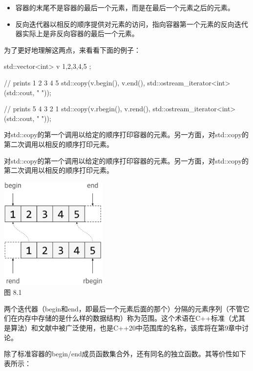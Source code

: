 \begin{itemize}
  \item
        容器的末尾不是容器的最后一个元素，而是在最后一个元素之后的元素。

  \item
        反向迭代器以相反的顺序提供对元素的访问，指向容器第一个元素的反向迭代器实际上是非反向容器的最后一个元素。
\end{itemize}

为了更好地理解这两点，来看看下面的例子：

\begin{cpp}
std::vector<int> v{ 1,2,3,4,5 };

// prints 1 2 3 4 5
std::copy(v.begin(), v.end(),
		  std::ostream_iterator<int>(std::cout, " "));

// prints 5 4 3 2 1
std::copy(v.rbegin(), v.rend(),
		  std::ostream_iterator<int>(std::cout, " "));
\end{cpp}

对std::copy的第一个调用以给定的顺序打印容器的元素。另一方面，对std::copy的第二次调用以相反的顺序打印元素。

对std::copy的第一个调用以给定的顺序打印容器的元素。另一方面，对std::copy的第二次调用以相反的顺序打印元素。

\begin{center}
  \includegraphics[width=0.4\textwidth]{images/1.png}\\
  图 8.1
\end{center}

两个迭代器（begin和end，即最后一个元素后面的那个）分隔的元素序列（不管它们在内存中存储的是什么样的数据结构）称为范围。这个术语在C++标准（尤其是算法）和文献中被广泛使用，也是C++20中范围库的名称，该库将在第9章中讨论。

除了标准容器的begin/end成员函数集合外，还有同名的独立函数。其等价性如下表所示：

